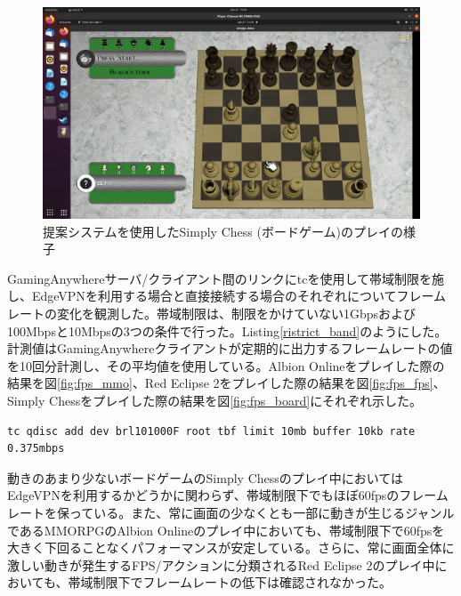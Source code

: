 \begin{figure}[h!]
    \centering
    \includegraphics[width=\textwidth,keepaspectratio,clip]{img/screen_board.pdf}
    \caption{提案システムを使用したSimply Chess (ボードゲーム)のプレイの様子}
    \label{fig:screen_board}
\end{figure}

GamingAnywhereサーバ/クライアント間のリンクにtcを使用して帯域制限を施し、EdgeVPNを利用する場合と直接接続する場合のそれぞれについてフレームレートの変化を観測した。帯域制限は、制限をかけていない1Gbpsおよび100Mbpsと10Mbpsの3つの条件で行った。Listing\ref{ristrict_band}のようにした。計測値はGamingAnywhereクライアントが定期的に出力するフレームレートの値を10回分計測し、その平均値を使用している。Albion Onlineをプレイした際の結果を図\ref{fig:fps_mmo}、Red Eclipse 2をプレイした際の結果を図\ref{fig:fps_fps}、Simply Chessをプレイした際の結果を図\ref{fig:fps_board}にそれぞれ示した。

\begin{lstlisting}[caption=帯域制限,label=ristrict_band]
    tc qdisc add dev brl101000F root tbf limit 10mb buffer 10kb rate 0.375mbps
\end{lstlisting}

動きのあまり少ないボードゲームのSimply Chessのプレイ中においてはEdgeVPNを利用するかどうかに関わらず、帯域制限下でもほぼ60fpsのフレームレートを保っている。また、常に画面の少なくとも一部に動きが生じるジャンルであるMMORPGのAlbion Onlineのプレイ中においても、帯域制限下で60fpsを大きく下回ることなくパフォーマンスが安定している。さらに、常に画面全体に激しい動きが発生するFPS/アクションに分類されるRed Eclipse 2のプレイ中においても、帯域制限下でフレームレートの低下は確認されなかった。

